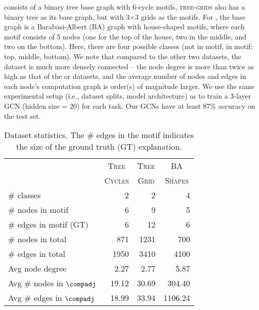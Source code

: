 \synfour{} consists of a binary tree base graph with 6-cycle motifs, \textsc{tree-grids} also has a binary tree as its base graph, but with 3$\times$3 grids as the motifs. 
For \synone{}, the base graph is a Barabasi-Albert (BA) graph with house-shaped motifs, where each motif consists of 5 nodes (one for the top of the house, two in the middle, and two on the bottom). 
Here, there are four possible classes (not in motif, in motif: top, middle, bottom). 
We note that compared to the other two datasets, the \synone{} dataset is much more densely connected -- the node degree is more than twice as high as that of the \synfour{} or \synfive{} datasets, and the average number of nodes and edges in each node's computation graph is order(s) of magnitude larger. 
We use the same experimental setup (i.e., dataset splits, model architecture) as \citet{ying_gnnexplainer_2019} to train a 3-layer GCN (hidden size = 20) for each task. 
Our GCNs have at least 87\% accuracy on the test set. 






\begin{table}[]
\caption{Dataset statistics. The \# edges in the motif indicates the size of the ground truth (GT) explanation. }
\label{table:stats}
\centering
\begin{tabular}{lrrr}
\toprule
                          & \multicolumn{1}{c}{\textsc{Tree}}   & \multicolumn{1}{c}{\textsc{Tree}} & \multicolumn{1}{c}{\textsc{BA}}     \\
                          & \multicolumn{1}{c}{\textsc{Cycles}} & \multicolumn{1}{c}{\textsc{Grid}} & \multicolumn{1}{c}{\textsc{Shapes}} \\ 
\midrule
\# classes                 & 2                         & 2               & 4                          \\ 

\# nodes in motif                 & 6                        & 9            & 5                        \\
\# edges in motif      (GT)            & 6                       & 12             & 6                \\
\midrule
\# nodes in total                  & 871                        & 1231            & 700                        \\
\# edges in total                  & 1950                       & 3410             & 4100                \\

\midrule
Avg node degree           & 2.27                       & 2.77                     & 5.87                       \\
Avg \# nodes in $\compadj$ & 19.12                      & 30.69                    & 304.40                     \\
Avg \# edges in $\compadj$ & 18.99                      & 33.94                    & 1106.24                    \\
\bottomrule
\end{tabular}
\end{table}




